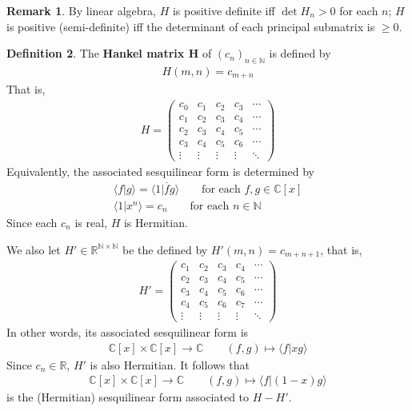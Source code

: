 \documentclass[12pt,b5paper,notitlepage]{article}
\theoremstyle{definition}
\newtheorem{df}{Definition}[subsection]
\newtheorem{rem}[df]{Remark}
\theoremstyle{plain}
\newcommand{\ovl}{\overline}
\newcommand{\bk}[1]{\langle {#1}\rangle}
\newcommand{\bigbk}[1]{\big\langle {#1}\big\rangle}
\newcommand{\Cbb}{\mathbb C}
\newcommand{\Nbb}{\mathbb N}
\newcommand{\Rbb}{\mathbb R}
\newcommand{\hqed}{\hfill\qedsymbol}
\numberwithin{equation}{section}
\begin{document}
\begin{rem}
By linear algebra, $H$ is positive definite iff $\det H_n>0$ for each $n$; $H$ is positive (semi-definite) iff the determinant of each principal submatrix is $\geq0$.
\end{rem}


\begin{df}\label{lb203}
The \textbf{Hankel matrix $\pmb H$}  of $(c_n)_{n\in\Nbb}$ is defined by
\begin{align*}
H(m,n)=c_{m+n}
\end{align*}
That is,
\begin{align*}
H=\begin{pmatrix}
c_0&c_1&c_2&c_3&\cdots\\
c_1&c_2&c_3&c_4&\cdots\\
c_2&c_3&c_4&c_5&\cdots\\
c_3&c_4&c_5&c_6&\cdots\\
\vdots&\vdots&\vdots&\vdots&\ddots
\end{pmatrix}
\end{align*}
Equivalently, the associated sesquilinear form is determined by
\begin{subequations}\label{eq80}
\begin{gather}
\bigbk{f\big|g}=\bigbk{1\big|\ovl fg}\qquad\text{for each }f,g\in\Cbb[x]\label{eq80a}\\
\bigbk{1\big|x^n}=c_n\qquad\text{for each }n\in\Nbb\label{eq80b}
\end{gather}
\end{subequations}
Since each $c_n$ is real, $H$ is Hermitian.

We also let $H'\in\Rbb^{\Nbb\times \Nbb}$ be the defined by $H'(m,n)=c_{m+n+1}$, that is,
\begin{align*}
H'=\begin{pmatrix}
c_1&c_2&c_3&c_4&\cdots\\
c_2&c_3&c_4&c_5&\cdots\\
c_3&c_4&c_5&c_6&\cdots\\
c_4&c_5&c_6&c_7&\cdots\\
\vdots&\vdots&\vdots&\vdots&\ddots
\end{pmatrix}
\end{align*}
In other words, its associated sesquilinear form is
\begin{align}\label{eq81}
\Cbb[x]\times\Cbb[x]\rightarrow\Cbb\qquad (f,g)\mapsto \bk{f|xg}
\end{align}
Since $c_n\in\Rbb$, $H'$ is also Hermitian. It follows that
\begin{align}\label{eq82}
\Cbb[x]\times\Cbb[x]\rightarrow\Cbb\qquad (f,g)\mapsto \bk{f|(1-x)g}
\end{align}
is the (Hermitian) sesquilinear form associated to $H-H'$. \hqed
\end{df}
\end{document}
